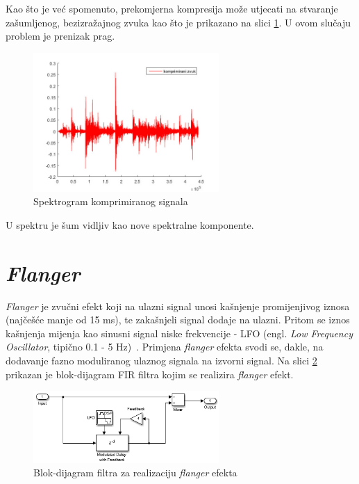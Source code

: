 \documentclass[conference]{IEEEtran}
\begin{document}
Kao što je već spomenuto, prekomjerna kompresija može utjecati na stvaranje zašumljenog, bezizražajnog
zvuka kao što je prikazano na slici \ref{komp_sum}. U ovom slučaju problem je prenizak prag.

\begin{figure}[H]
    \includegraphics[width=200pt]{slike/prenizak_prag.jpg}
    \centering
    \caption{Spektrogram komprimiranog signala}
    \label{komp_sum}
\end{figure}

U spektru je šum vidljiv kao nove spektralne komponente.

\section{\textit{Flanger}}

\textit{Flanger} je zvučni efekt koji na ulazni signal unosi kašnjenje promijenjivog iznosa (najčešće manje
od 15 ms), te zakašnjeli signal dodaje na ulazni. Pritom se iznos kašnjenja mijenja kao sinusni signal
niske frekvencije - LFO (engl. \textit{Low Frequency Oscillator}, tipično 0.1 - 5 Hz)~\cite{b1}.
Primjena \textit{flanger} efekta svodi se, dakle, na dodavanje fazno moduliranog ulaznog signala na izvorni
signal. Na slici \ref{flang_simulink} prikazan je blok-dijagram FIR filtra kojim se realizira \textit{flanger}
efekt.

\begin{figure}[H]
    \includegraphics[width=200pt]{slike/flanger_simulink.png}
    \centering
    \caption{Blok-dijagram filtra za realizaciju \textit{flanger} efekta~\cite{b4}}
    \label{flang_simulink}
\end{figure}
\end{document}
